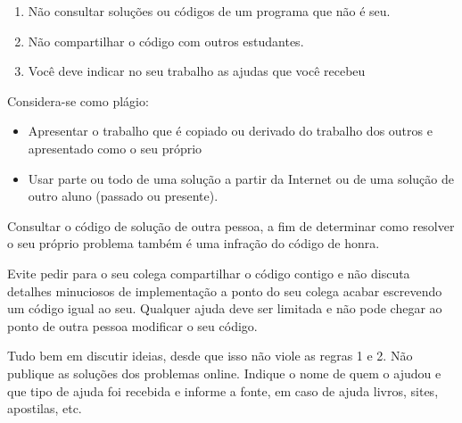   \begin{enumerate}
\item Não consultar soluções ou códigos de um programa que não é seu.
\item Não compartilhar o código com outros estudantes.
\item Você deve indicar no seu trabalho as ajudas que você recebeu
\end{enumerate}

Considera-se como plágio:
\begin{itemize}
\item Apresentar o trabalho que é copiado ou derivado do trabalho dos outros e apresentado como o seu próprio
\item  Usar parte ou todo de uma solução a partir da Internet ou de uma solução de outro aluno (passado ou presente).
\end{itemize}
  
Consultar o  código de solução de outra pessoa, a fim de determinar como resolver o seu próprio problema também é uma infração do código de honra. 

Evite pedir para o seu colega compartilhar o código contigo e não discuta detalhes minuciosos de implementação a ponto do seu colega acabar escrevendo um código igual ao seu. Qualquer ajuda deve ser limitada e não pode chegar ao ponto de outra pessoa modificar o seu código.

Tudo bem em discutir ideias, desde que isso não viole as regras 1 e 2. Não publique as soluções dos problemas online.  Indique o nome de quem o ajudou e que tipo de ajuda foi recebida e informe a fonte, em caso de ajuda livros, sites, apostilas, etc.


  
